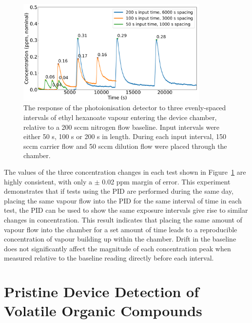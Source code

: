 \documentclass[
  a4paper,
]{scrbook}
\begin{document}
\begin{figure}

{\centering \includegraphics[width=0.85\textwidth,height=\textheight]{figures/ch9/input_time_comparison_PID.png}

}

\caption[The response of the photoionisation detector to three
evenly-spaced intervals of ethyl hexanoate vapour entering the device
chamber, relative to a 200 sccm nitrogen flow
baseline.]{\label{fig-concentration-comparison}The response of the
photoionisation detector to three evenly-spaced intervals of ethyl
hexanoate vapour entering the device chamber, relative to a 200 sccm
nitrogen flow baseline. Input intervals were either 50 s, 100 s or 200 s
in length. During each input interval, 150 sccm carrier flow and 50 sccm
dilution flow were placed through the chamber.}

\end{figure}

The values of the three concentration changes in each test shown in
Figure~\ref{fig-concentration-comparison} are highly consistent, with
only a \(\pm\) 0.02 ppm margin of error. This experiment demonstrates
that if tests using the PID are performed during the same day, placing
the same vapour flow into the PID for the same interval of time in each
test, the PID can be used to show the same exposure intervals give rise
to similar changes in concentration. This result indicates that placing
the same amount of vapour flow into the chamber for a set amount of time
leads to a reproducible concentration of vapour building up within the
chamber. Drift in the baseline does not significantly affect the
magnitude of each concentration peak when measured relative to the
baseline reading directly before each interval.

\hypertarget{sec-pristine-EtHex}{%
\section{Pristine Device Detection of Volatile Organic
Compounds}\label{sec-pristine-EtHex}}
\end{document}
